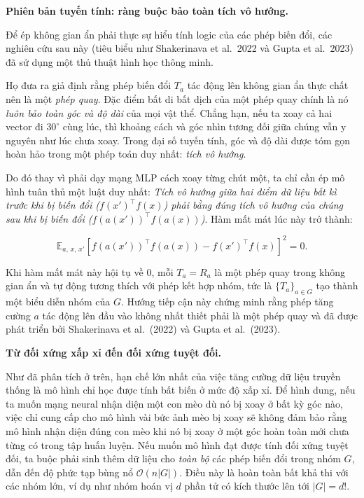 \textbf{Phiên bản tuyến tính: ràng buộc bảo toàn tích vô hướng.}

Để ép không gian ẩn phải thực sự hiểu tính logic của các phép biến đổi, các nghiên cứu sau này (tiêu biểu như Shakerinava et al.\ 2022 và Gupta et al.\ 2023) đã sử dụng một thủ thuật hình học thông minh. 

Họ đưa ra giả định rằng phép biến đổi $T_a$ tác động lên không gian ẩn thực chất nên là một \textit{phép quay}. Đặc điểm bất di bất dịch của một phép quay chính là nó \textit{luôn bảo toàn góc và độ dài} của mọi vật thể. Chẳng hạn, nếu ta xoay cả hai vector đi $30^\circ$ cùng lúc, thì khoảng cách và góc nhìn tương đối giữa chúng vẫn y nguyên như lúc chưa xoay. Trong đại số tuyến tính, góc và độ dài được tóm gọn hoàn hảo trong một phép toán duy nhất: \textit{tích vô hướng}.

Do đó thay vì phải dạy mạng MLP cách xoay từng chút một, ta chỉ cần ép mô hình tuân thủ một luật duy nhất: \textit{Tích vô hướng giữa hai điểm dữ liệu bất kì trước khi bị biến đổi ($f(x')^\top f(x)$) phải bằng đúng tích vô hướng của chúng sau khi bị biến đổi ($f(a(x'))^\top f(a(x))$)}. Hàm mất mát lúc này trở thành:

\begin{equation}
    \mathbb{E}_{a,\, x,\, x'} \left[ f(a(x'))^\top f(a(x)) - f(x')^\top f(x) \right]^2 = 0.
\end{equation}

Khi hàm mất mát này hội tụ về 0, mỗi $T_a = R_a$ là một phép quay trong không gian ẩn và tự động tương thích với phép kết hợp nhóm, tức là $\{T_a\}_{a \in G}$ tạo thành một biểu diễn nhóm của $G$. Hướng tiếp cận này chứng minh rằng phép tăng cường $a$ tác động lên đầu vào không nhất thiết phải là một phép quay và đã được phát triển bởi Shakerinava et al.\ (2022) và Gupta et al.\ (2023).

\vspace{0.5em}
\textbf{Từ đối xứng xấp xỉ đến đối xứng tuyệt đối.}

Như đã phân tích ở trên, hạn chế lớn nhất của việc tăng cường dữ liệu truyền thống là mô hình chỉ học được tính bất biến ở mức độ xấp xỉ. Để hình dung, nếu ta muốn mạng neural nhận diện một con mèo dù nó bị xoay ở bất kỳ góc nào, việc chỉ cung cấp cho mô hình vài bức ảnh mèo bị xoay sẽ không đảm bảo rằng mô hình nhận diện đúng con mèo khi nó bị xoay ở một góc hoàn toàn mới chưa từng có trong tập huấn luyện. Nếu muốn mô hình đạt được tính đối xứng tuyệt đối, ta buộc phải sinh thêm dữ liệu cho \textit{toàn bộ} các phép biến đổi trong nhóm $G$, dẫn đến độ phức tạp bùng nổ $\mathcal{O}(n|G|)$. Điều này là hoàn toàn bất khả thi với các nhóm lớn, ví dụ như nhóm hoán vị $d$ phần tử có kích thước lên tới $|G| = d!$.

